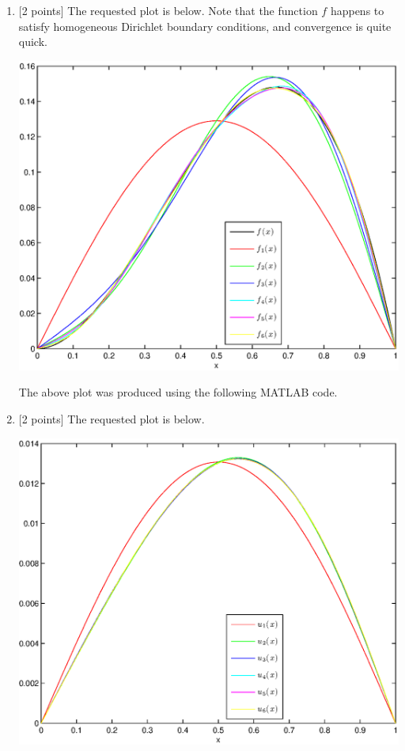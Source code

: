 \begin{solution}
\begin{enumerate}
\item {[2 points]} The requested plot is below. Note that the function $f$ happens to satisfy homogeneous Dirichlet boundary conditions, and convergence is quite quick.

\begin{center}\includegraphics[scale=0.7]{hw27c.eps}\end{center}

The above plot was produced using the following MATLAB code.



\item {[2 points]} The requested plot is below.

\begin{center}\includegraphics[scale=0.7]{hw27d.eps}\end{center}


\end{enumerate}
\end{solution}
